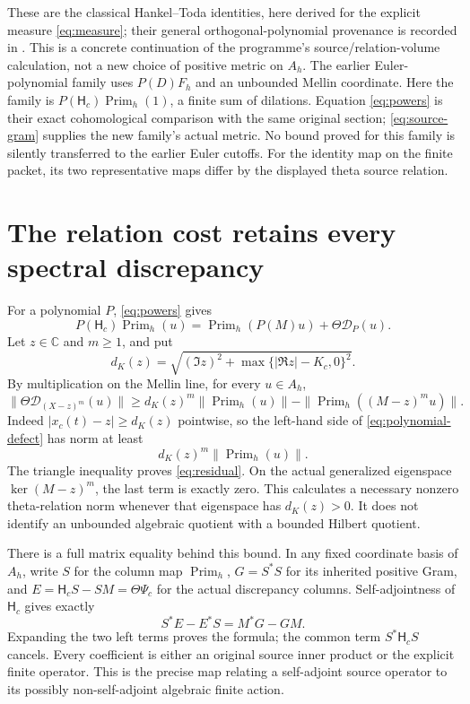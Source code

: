 \documentclass[11pt]{article}
\newcommand{\C}{\mathbb C}
\newcommand{\PP}{\operatorname{Prim}_h}
\newcommand{\HS}{\mathsf H_c}
\begin{document}
These are the classical Hankel--Toda identities, here derived for the
explicit measure \eqref{eq:measure}; their general orthogonal-polynomial
provenance is recorded in \cite{Toda}. This is a concrete continuation of
the programme's source/relation-volume calculation, not a new choice of
positive metric on $A_h$. The earlier Euler-polynomial family uses
$P(D)F_h$ and an unbounded Mellin coordinate. Here the family is
$P(\HS)\PP(1)$, a finite sum of dilations. Equation \eqref{eq:powers}
is their exact cohomological comparison with the same original section;
\eqref{eq:source-gram} supplies the new family's actual metric.
No bound proved for this family is silently transferred to the earlier
Euler cutoffs. For the identity map on the finite packet, its two
representative maps differ by the displayed theta source relation.

\section{The relation cost retains every spectral discrepancy}
For a polynomial $P$, \eqref{eq:powers} gives
\begin{equation}
 P(\HS)\PP(u)=\PP(P(M)u)+\Theta\mathcal D_P(u).
 \label{eq:polynomial-defect}
\end{equation}
Let $z\in\C$ and $m\ge1$, and put
\begin{equation}
 d_K(z)=\sqrt{(\Im z)^2+\max\{|\Re z|-K_c,0\}^2}.
\end{equation}
By multiplication on the Mellin line, for every $u\in A_h$,
\begin{equation}
 \|\Theta\mathcal D_{(X-z)^m}(u)\|
 \ge d_K(z)^m\|\PP(u)\|-\|\PP((M-z)^mu)\|.
 \label{eq:residual}
\end{equation}
Indeed $|x_c(t)-z|\ge d_K(z)$ pointwise, so the left-hand side of
\eqref{eq:polynomial-defect} has norm at least
\[
 d_K(z)^m\|\PP(u)\|.
\]
The triangle inequality proves
\eqref{eq:residual}. On the actual generalized eigenspace
$\ker(M-z)^m$, the last term is exactly zero. This calculates a
necessary nonzero theta-relation norm whenever that eigenspace has
$d_K(z)>0$. It does not identify an unbounded algebraic quotient
with a bounded Hilbert quotient.

There is a full matrix equality behind this bound. In any fixed
coordinate basis of $A_h$, write $S$ for the column map $\PP$,
$G=S^*S$ for its inherited positive Gram, and
$E=\HS S-SM=\Theta\Psi_c$ for the actual discrepancy columns.
Self-adjointness of $\HS$ gives exactly
\begin{equation}
 S^*E-E^*S=M^*G-GM.\label{eq:matrix-defect}
\end{equation}
Expanding the two left terms proves the formula; the common term
$S^*\HS S$ cancels. Every coefficient is either an original source
inner product or the explicit finite operator. This is the precise
map relating a self-adjoint source operator to its possibly
non-self-adjoint algebraic finite action.
\end{document}
